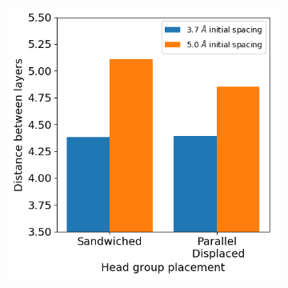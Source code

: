 \documentclass[journal=jpcbfk,manusciprt=article]{achemso}
\begin{document}

  \begin{figure}[!hbt]
        \centering
        \begin{subfigure}{0.45\linewidth}
                \centering
                \includegraphics[width=\linewidth]{dbwl.png}
                \caption{}~\label{fig:dbwl_disordered}
        \end{subfigure}%
        \begin{subfigure}{0.45\linewidth}
                \centering

\end{subfigure}
\end{figure}
\end{document}
